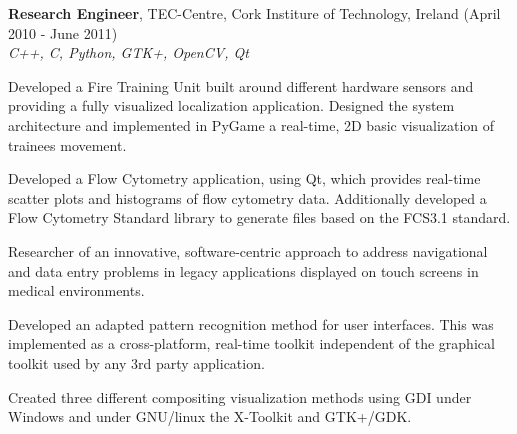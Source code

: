 \documentclass[alan.tex]{subfiles}
\begin{document}
  \item \textbf{Research Engineer}, TEC-Centre, Cork Institure of Technology, Ireland (April 2010 - June 2011)\\
    \emph{C++, C, Python, GTK+, OpenCV, Qt}
    \begin{my_desc}
      \item[Developed] a Fire Training Unit built around different hardware sensors and providing a fully visualized localization application. Designed the system architecture and implemented in PyGame a real-time, 2D basic visualization of trainees movement.
      \item[Developed] a Flow Cytometry application, using Qt, which provides real-time scatter plots and histograms of flow cytometry data. Additionally developed a Flow Cytometry Standard library to generate files based on the FCS3.1 standard.
      \item[Researcher] of an innovative, software-centric approach to address navigational and data entry problems in legacy applications displayed on touch screens in medical environments. 
      \begin{my_bullets}
        \item Developed an adapted pattern recognition method for user interfaces. This was implemented as a cross-platform, real-time toolkit independent of the graphical toolkit used by any 3rd party application. 
        \item Created three different compositing visualization methods using GDI under Windows and under GNU/linux the X-Toolkit and GTK+/GDK.
      \end{my_bullets}
  \end{my_desc}
\end{document}
